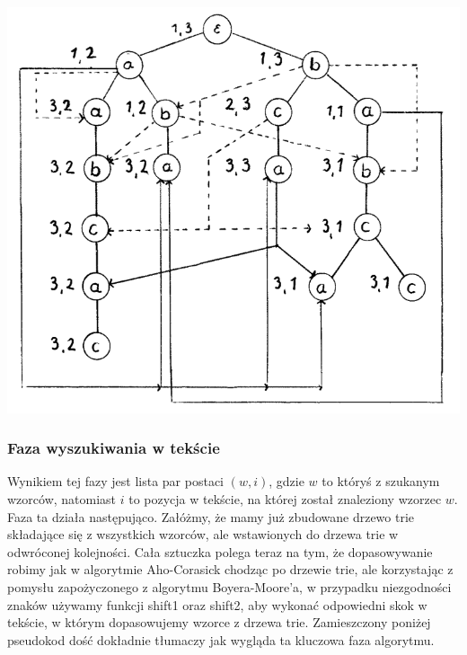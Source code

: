 \begin{center}
\includegraphics[scale=0.4]{graphics/trie-example-2.png}
\end{center}

\subsubsection{Faza wyszukiwania w tekście}
Wynikiem tej fazy jest lista par postaci $(w, i)$, gdzie $w$ to któryś z szukanym wzorców, natomiast $i$ to pozycja w tekście, na której został znaleziony wzorzec $w$. Faza ta działa następująco. Załóżmy, że mamy już zbudowane drzewo trie składające się z wszystkich wzorców, ale wstawionych do drzewa trie w odwróconej kolejności. Cała sztuczka polega teraz na tym, że dopasowywanie robimy jak w algorytmie Aho-Corasick chodząc po drzewie trie, ale korzystając z pomysłu zapożyczonego z algorytmu Boyera-Moore'a, w przypadku niezgodności znaków używamy funkcji shift1 oraz shift2, aby wykonać odpowiedni skok w tekście, w którym dopasowujemy wzorce z drzewa trie. Zamieszczony poniżej pseudokod dość dokładnie tłumaczy jak wygląda ta kluczowa faza algorytmu.

